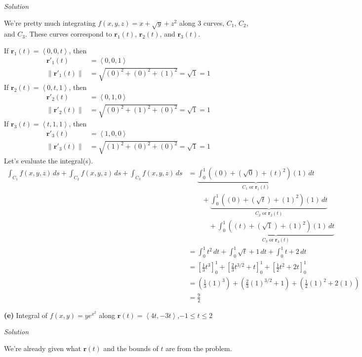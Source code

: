 \documentclass{article}
\newcommand{\lrp}[1]{\left( #1 \right)}
\newcommand{\lra}[1]{\left\langle #1 \right\rangle}
\newcommand{\lrb}[1]{\left[ #1 \right]}
\newcommand{\norm}[1]{\left\lVert #1 \right\rVert}
\renewcommand{\r}[0]{\mathbf{r}}
\newcommand{\Solution}{\textit{Solution}}
\begin{document}
\Solution

We're pretty much integrating $f(x,y,z)=x+\sqrt{y}+z^2$ along 3 curves, $C_1$, $C_2$, and $C_3$. These curves correspond to $\r_1(t)$, $\r_2(t)$, and $\r_3(t)$.

If $\r_1(t)=\lra{0,0,t}$, then
\begin{align*}
    \r'_1(t)&=\lra{0,0,1}\\
    \norm{\r'_1(t)}&=\sqrt{(0)^2+(0)^2+(1)^2}=\sqrt{1}=1
\end{align*}
If $\r_2(t)=\lra{0,t,1}$, then
\begin{align*}
    \r'_2(t)&=\lra{0,1,0}\\
    \norm{\r'_2(t)}&=\sqrt{(0)^2+(1)^2+(0)^2}=\sqrt{1}=1
\end{align*}
If $\r_3(t)=\lra{t,1,1}$, then
\begin{align*}
    \r'_3(t)&=\lra{1,0,0}\\
    \norm{\r'_3(t)}&=\sqrt{(1)^2+(0)^2+(0)^2}=\sqrt{1}=1
\end{align*}
Let's evaluate the integral(s).
\begin{align*}
    \int_{C_1} f(x,y,z)\,ds+ \int_{C_2} f(x,y,z)\,ds+ \int_{C_3} f(x,y,z)\,ds&=\underbrace{\int_0^1 \lrp{\lrp{0}+\lrp{\sqrt{0}}+\lrp{t}^2}\lrp{1}\,dt}_{C_1\text{ or }\r_1(t)}\\
    &\hspace{2em}+\underbrace{\int_0^1 \lrp{\lrp{0}+\lrp{\sqrt{t}}+\lrp{1}^2}\lrp{1}\,dt}_{C_2 \text{ or } \r_2(t)}\\
    &\hspace{3em}+\underbrace{\int_0^1 \lrp{\lrp{t}+\lrp{\sqrt{1}}+\lrp{1}^2}\lrp{1}\,dt}_{C_3 \text{ or }\r_3(t)}\\
    &=\int_0^1 t^2\,dt+\int_0^1 \sqrt{t}+1\,dt+\int_0^1 t + 2\,dt\\
    &=\lrb{\frac{1}{3}t^3}_0^1 +\lrb{\frac{2}{3}t^{3/2}+t}_0^1+\lrb{\frac{1}{2}t^2+2t}_0^1\\
    &=\lrp{\frac{1}{3}(1)^3} +\lrp{\frac{2}{3}(1)^{3/2}+1}+\lrp{\frac{1}{2}(1)^2+2(1)}\\
    &=\boxed{\frac{9}{2}}\tag{use a calculator}
\end{align*}
{}\textbf{(e)} Integral of $\displaystyle f(x,y)=ye^{x^2}$ along $\r(t)=\lra{4t,-3t}$,$-1\leq t\leq 2$

\Solution

We're already given what $\r(t)$ and the bounds of $t$ are from the problem.
\end{document}
